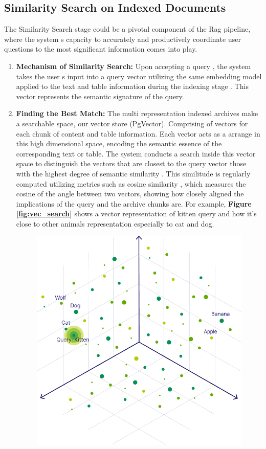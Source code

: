 \subsection{Similarity Search on Indexed Documents}
The Similarity Search stage could be a pivotal component of the Rag pipeline, where the system s capacity to accurately and productively coordinate user questions to the most significant information comes into play.
\vskip 0.5cm
\begin{enumerate}
    \item \textbf{Mechanism of Similarity Search:} Upon accepting a query , the system takes the user s input into a query vector utilizing the same embedding model applied to the text and table information during the indexing stage . This vector represents the semantic signature of the query.
    \vskip 0.5cm
    \item \textbf{Finding the Best Match:} The multi representation indexed archives make a searchable space, our vector store (PgVector). Comprising of vectors for each chunk of content and table information. Each vector acts as a arrange in this high dimensional space, encoding the semantic essence of the corresponding text or table.
    \vskip 0.5cm
    The system conducts a search inside this vector space to distinguish the vectors that are closest to the query vector those with the highest degree of semantic similarity . This similitude is regularly computed utilizing metrics such as cosine similarity , which measures the cosine of the angle between two vectors, showing how closely aligned the implications of the query and the archive chunks are. For example, \textbf{Figure \ref{fig:vec_search}} shows a vector representation of kitten query and how it's close to other animals representation especially to cat and dog.
    \vskip 0.5cm
    \begin{figure}[H]
        \centering
        \includegraphics[width=0.8 \linewidth]{assets/vec_search.jpg}

\end{figure}
\end{enumerate}
